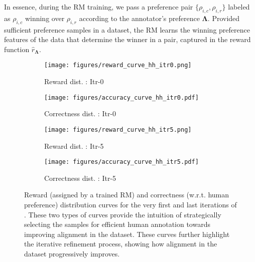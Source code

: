 In essence, during the RM training, we pass a preference pair $\{\rho_{i,c}, \rho_{i,r}\}$ labeled as $\rho_{i,c}$ winning over $\rho_{i,r}$ according to the annotator's preference $\mathbf{\Lambda}$. Provided sufficient preference samples in a dataset, the RM learns the winning preference features of the data that determine the winner in a pair, captured in the reward function $\hat{r}_{\mathbf{\Lambda}}$.
\begin{figure*}[t]
\centering
\begin{subfigure}{0.23\linewidth}
\centering
\texttt{[image: figures/reward\_curve\_hh\_itr0.png]}
\caption{Reward dist. : Itr-0}
\label{fig:hh_itr0_reward_curve}
\end{subfigure}
\begin{subfigure}{0.23\linewidth}
\centering
\texttt{[image: figures/accuracy\_curve\_hh\_itr0.pdf]}
\caption{Correctness dist. : Itr-0}
\label{fig:hh_itr0_accuracy_curve}
\end{subfigure}
\begin{subfigure}{0.23\linewidth}
\centering
\texttt{[image: figures/reward\_curve\_hh\_itr5.png]}
\caption{Reward dist. : Itr-5}
\label{fig:hh_itr5_reward_curve}
\end{subfigure}
\begin{subfigure}{0.23\linewidth}
\centering
\texttt{[image: figures/accuracy\_curve\_hh\_itr5.pdf]}
\caption{Correctness dist. : Itr-5}
\label{fig:hh_itr5_accuracy_curve}
\end{subfigure}
\caption{Reward (assigned by a trained RM) and correctness (w.r.t. human preference) distribution curves for the very first and last iterations of \myname{}. These two types of curves provide the intuition of strategically selecting the samples for efficient human annotation towards improving alignment in the dataset. These curves further highlight the iterative refinement process, showing how alignment in the dataset progressively improves.}\vspace{-0.2in}
\label{fig:hh_reward_and_accuracy_curve}
\end{figure*}

